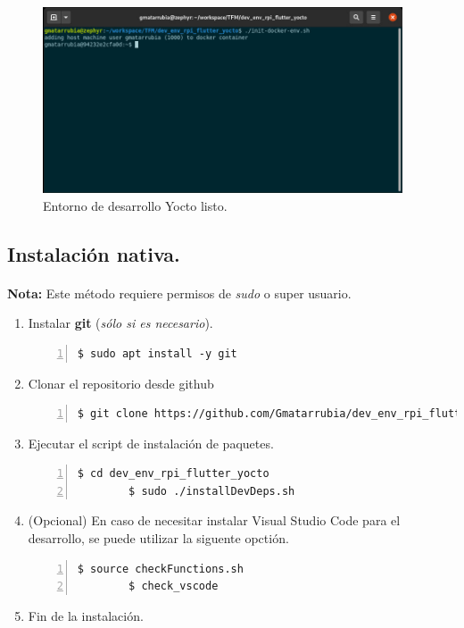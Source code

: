 \begin{figure}[H]
    \centering
    \includegraphics[width=0.95\textwidth]{imgs/yocto-docker-ready}
    \caption[yocto docker ready]{Entorno de desarrollo Yocto listo.}
    \label{imgs:yocto-docker-ready}
\end{figure}

\subsection{Instalación nativa.}

\paragraph{}\textbf{Nota:} Este método requiere permisos de \emph{sudo} o super usuario.

\begin{enumerate}
    \item Instalar \textbf{\gls{git}} (\emph{sólo si es necesario}).
    \begin{lstlisting}[style=consola, numbers=left]
        $ sudo apt install -y git
    \end{lstlisting}

    \item Clonar el repositorio desde github
    \begin{lstlisting}[style=consola, numbers=left]
        $ git clone https://github.com/Gmatarrubia/dev_env_rpi_flutter_yocto.git
    \end{lstlisting}

    \item Ejecutar el script de instalación de paquetes.
    \begin{lstlisting}[style=consola, numbers=left]
        $ cd dev_env_rpi_flutter_yocto
        $ sudo ./installDevDeps.sh
    \end{lstlisting}

    \item (Opcional) En caso de necesitar instalar Visual Studio Code para el desarrollo,
    se puede utilizar la siguente opctión.
    \begin{lstlisting}[style=consola, numbers=left]
        $ source checkFunctions.sh
        $ check_vscode
    \end{lstlisting}

    \item Fin de la instalación.
\end{enumerate}

